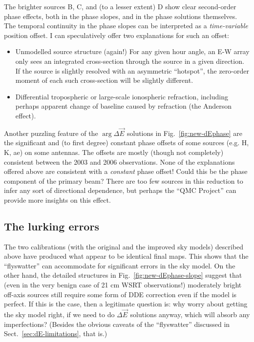 \documentclass{aa}
\newcommand{\jones}[2]{\vec {#1}_{#2}}
\begin{document}
The brighter sources B, C, and (to a lesser extent) D show clear second-order phase effects, both in the phase slopes, and in the phase solutions themselves. The temporal continuity in the phase slopes can be interpreted as a \emph{time-variable} position offset. I can speculatively offer two explanations for such an offset:

\begin{itemize}
\item Unmodelled source structure (again!) For any given hour angle, an E-W array only sees an integrated cross-section through the source in a given direction. If the source is slightly resolved with an asymmetric ``hotspot'', the zero-order moment of each such cross-section will be slightly different. 
\item Differential tropospheric or large-scale ionospheric refraction, including perhaps apparent change of baseline caused by refraction (the Anderson effect).
\end{itemize}

Another puzzling feature of the $\arg\Delta\jones{E}{}$ solutions in Fig.~\ref{fig:new-dEphase}
are the significant and (to first degree) constant phase offsets of some sources (e.g. H, K, ae) on some antennas. The offsets are mostly (though not completely) consistent between the 2003 and 2006 observations. None of the explanations offered above are consistent with a \emph{constant} phase offset! Could this be the phase component of the primary beam? There are too few sources in this reduction to infer any sort of directional dependence, but perhaps the ``QMC Project'' can provide more insights on this effect.

\subsection{The lurking errors\label{sec:deep-errors}}

The two calibrations (with the original and the improved sky models) described above have produced what appear to be identical final maps. This shows that the ``flyswatter'' can accommodate for significant errors in the sky model. On the other hand, the detailed structures in Fig.~\ref{fig:new-dEphase-slope} suggest that (even in the very benign case of 21 cm WSRT observations!) moderately bright off-axis sources still require some form of DDE correction even if the model is perfect. If this is the case, then a legitimate question is: why worry about getting the sky model right, if we need to do $\Delta\jones{E}{}$ solutions anyway, which will absorb any imperfections? (Besides the obvious caveats of the ``flyswatter'' discussed in Sect.~\ref{sec:dE-limitations}, that is.)
\end{document}
